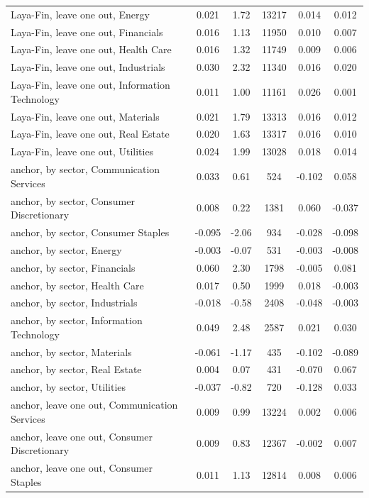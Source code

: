 \begin{longtable}{@{}lS[table-format=-1.3]S[table-format=-1.2]S[table-format=5.0]S[table-format=-1.3]S[table-format=-1.3]@{}}
Laya-Fin, leave one out, Energy & 0.021 & 1.72 & 13217 & 0.014 & 0.012 \\
Laya-Fin, leave one out, Financials & 0.016 & 1.13 & 11950 & 0.010 & 0.007 \\
Laya-Fin, leave one out, Health Care & 0.016 & 1.32 & 11749 & 0.009 & 0.006 \\
Laya-Fin, leave one out, Industrials & 0.030 & 2.32 & 11340 & 0.016 & 0.020 \\
Laya-Fin, leave one out, Information Technology & 0.011 & 1.00 & 11161 & 0.026 & 0.001 \\
Laya-Fin, leave one out, Materials & 0.021 & 1.79 & 13313 & 0.016 & 0.012 \\
Laya-Fin, leave one out, Real Estate & 0.020 & 1.63 & 13317 & 0.016 & 0.010 \\
Laya-Fin, leave one out, Utilities & 0.024 & 1.99 & 13028 & 0.018 & 0.014 \\
anchor, by sector, Communication Services & 0.033 & 0.61 & 524 & -0.102 & 0.058 \\
anchor, by sector, Consumer Discretionary & 0.008 & 0.22 & 1381 & 0.060 & -0.037 \\
anchor, by sector, Consumer Staples & -0.095 & -2.06 & 934 & -0.028 & -0.098 \\
anchor, by sector, Energy & -0.003 & -0.07 & 531 & -0.003 & -0.008 \\
anchor, by sector, Financials & 0.060 & 2.30 & 1798 & -0.005 & 0.081 \\
anchor, by sector, Health Care & 0.017 & 0.50 & 1999 & 0.018 & -0.003 \\
anchor, by sector, Industrials & -0.018 & -0.58 & 2408 & -0.048 & -0.003 \\
anchor, by sector, Information Technology & 0.049 & 2.48 & 2587 & 0.021 & 0.030 \\
anchor, by sector, Materials & -0.061 & -1.17 & 435 & -0.102 & -0.089 \\
anchor, by sector, Real Estate & 0.004 & 0.07 & 431 & -0.070 & 0.067 \\
anchor, by sector, Utilities & -0.037 & -0.82 & 720 & -0.128 & 0.033 \\
anchor, leave one out, Communication Services & 0.009 & 0.99 & 13224 & 0.002 & 0.006 \\
anchor, leave one out, Consumer Discretionary & 0.009 & 0.83 & 12367 & -0.002 & 0.007 \\
anchor, leave one out, Consumer Staples & 0.011 & 1.13 & 12814 & 0.008 & 0.006 \\

\end{longtable}
